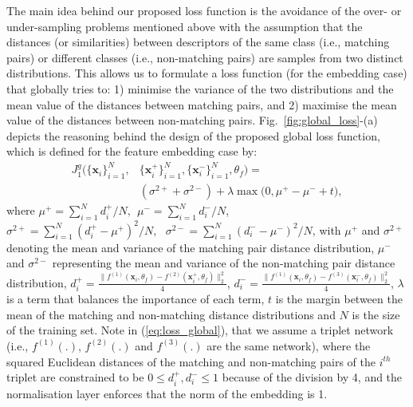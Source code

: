 \documentclass[10pt,twocolumn,letterpaper]{article}
\begin{document}
The main idea behind our proposed loss function is the avoidance of the over- or under-sampling problems mentioned above with the assumption that the distances (or similarities) between descriptors of the same class (i.e., matching pairs) or different classes (i.e., non-matching pairs) are samples from two distinct distributions. This allows us to formulate a loss function (for the embedding case) that globally tries to: 1) minimise the variance of the two distributions and the mean value of the distances between matching pairs, and 2) maximise the mean value of the distances between non-matching pairs.  Fig.~\ref{fig:global_loss}-(a) depicts the reasoning behind the design of the proposed global loss function, which is defined for the feature embedding case by:
\begin{equation}
\begin{split}
 J_1^g( \{ \mathbf{x}_i \}_{i=1}^N ,& \{ \mathbf{x}_i^+ \}_{i=1}^N, \{ \mathbf{x}_i^-\}_{i=1}^N , \theta_f ) = \\ &(\sigma^{2+}+\sigma^{2-})+\lambda \max\big(0,\mu^+ - \mu^- + t\big),
\end{split}
\label{eq:loss_global}
\end{equation}
where $\mu^+ = \sum_{i=1}^N d_i^+/N,~~ \mu^- = \sum_{i=1}^N d_i^-/N $, ~~
$\sigma^{2+} = \sum_{i=1}^N(d_i^+ -\mu^+)^2/N,~~~   \sigma^{2-} = \sum_{i=1}^N(d_i^- - \mu^-)^2/N$, with $\mu^+$ and $\sigma^{2+}$ denoting the mean and variance of the matching pair distance distribution,  
$\mu^-$ and $\sigma^{2-}$ representing the mean and variance of the non-matching pair distance distribution, 
 $d_i^+ = \frac{\lVert f^{(1)}(\mathbf{x}_i,\theta_f) - f^{(2)}(\mathbf{x}_i^+,\theta_f) \rVert_2^2}{4}$, $d_i^- = \frac{\lVert f^{(1)}(\mathbf{x}_i,\theta_f) - f^{(3)}(\mathbf{x}_i^-,\theta_f) \rVert_2^2}{4}$, 
$\lambda$ is a term that balances the importance of each term, $t$ is the margin between the mean of the matching and non-matching distance distributions and
$N$ is the size of the training set.
Note in (\ref{eq:loss_global}), that we assume a triplet network (i.e., $f^{(1)}(.)$, $f^{(2)}(.)$ and $f^{(3)}(.)$ are the same network), where the  
squared Euclidean distances of the matching and non-matching pairs of the $i^{th}$ triplet are constrained to be $0 \leq d_i^+, d_i^- \leq 1$ because of the division by 4, and the normalisation layer 
enforces that the norm of the embedding is 1. 
\end{document}
